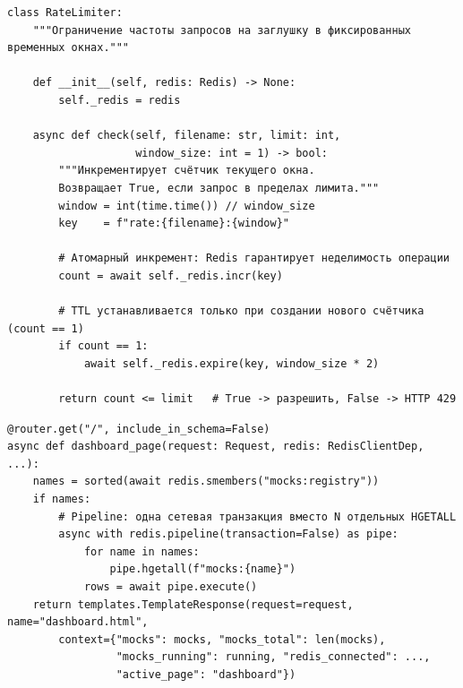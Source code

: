 \clearpage
\begin{listing}[H]
\caption{Реализация алгоритма Fixed Window Counter}
\label{lst:rate-limiter-impl}
\begin{mdframed}
\begin{verbatim}
class RateLimiter:
    """Ограничение частоты запросов на заглушку в фиксированных временных окнах."""

    def __init__(self, redis: Redis) -> None:
        self._redis = redis

    async def check(self, filename: str, limit: int,
                    window_size: int = 1) -> bool:
        """Инкрементирует счётчик текущего окна.
        Возвращает True, если запрос в пределах лимита."""
        window = int(time.time()) // window_size
        key    = f"rate:{filename}:{window}"

        # Атомарный инкремент: Redis гарантирует неделимость операции
        count = await self._redis.incr(key)

        # TTL устанавливается только при создании нового счётчика (count == 1)
        if count == 1:
            await self._redis.expire(key, window_size * 2)

        return count <= limit   # True -> разрешить, False -> HTTP 429
\end{verbatim}
\end{mdframed}
\end{listing}

\clearpage
\begin{listing}[H]
\caption{Маршрут панели управления: конвейерная выборка заглушек из Redis}
\label{lst:dashboard-route}
\begin{mdframed}
\begin{verbatim}
@router.get("/", include_in_schema=False)
async def dashboard_page(request: Request, redis: RedisClientDep, ...):
    names = sorted(await redis.smembers("mocks:registry"))
    if names:
        # Pipeline: одна сетевая транзакция вместо N отдельных HGETALL
        async with redis.pipeline(transaction=False) as pipe:
            for name in names:
                pipe.hgetall(f"mocks:{name}")
            rows = await pipe.execute()
    return templates.TemplateResponse(request=request, name="dashboard.html",
        context={"mocks": mocks, "mocks_total": len(mocks),
                 "mocks_running": running, "redis_connected": ...,
                 "active_page": "dashboard"})
\end{verbatim}
\end{mdframed}
\end{listing}

